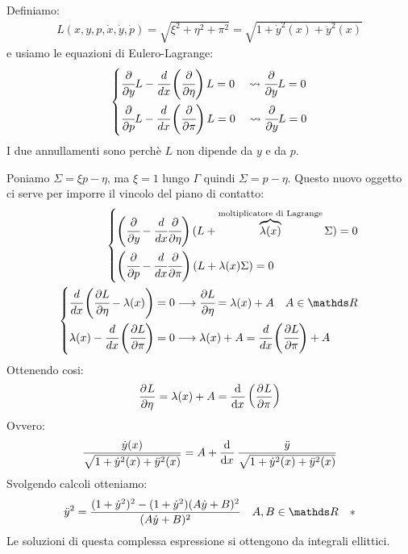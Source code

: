 Definiamo:
\begin{align*}
    L(x,y,p,\dot{x},\dot{y},\dot{p})=\sqrt{\xi^2+\eta^2+\pi^2}=\sqrt{1+\dot{y}^2(x)+\ddot{y}^2(x)}
\end{align*}
e usiamo le equazioni di Eulero-Lagrange:
\begin{align*}
    \begin{cases*}
        \cfrac{\partial}{\partial y}L-\cfrac{d}{dx}\left(\cfrac{\partial}{\partial \eta}\right)L=0 \quad \leadsto \cfrac{\partial}{\partial y}L=0\\
        \cfrac{\partial}{\partial p}L-\cfrac{d}{dx}\left(\cfrac{\partial}{\partial \pi}\right)L=0 \quad \leadsto \cfrac{\partial}{\partial y}L=0
    \end{cases*}
\end{align*}
I due annullamenti sono perchè $L$ non dipende da $y$ e da $p$.

Poniamo $\Sigma=\xi p-\eta$, ma $\xi=1$ lungo $\Gamma$ quindi $\Sigma=p-\eta$.
Questo nuovo oggetto ci serve per imporre il vincolo del piano di contatto:
\begin{align*}
    \begin{cases*}
        \left(\cfrac{\partial}{\partial y}-\cfrac{d}{dx}\cfrac{\partial}{\partial \eta}\right)(L+\overbrace{\lambda(x)}^{\text{moltiplicatore di Lagrange}}\Sigma)=0 \\
        \left(\cfrac{\partial}{\partial p}-\cfrac{d}{dx}\cfrac{\partial}{\partial \pi}\right)(L+\lambda(x)\Sigma)=0 
    \end{cases*}\\
    \begin{cases*}
        \cfrac{d}{dx}\left(\cfrac{\partial L}{\partial \eta}-\lambda(x)\right)=0\longrightarrow \cfrac{\partial L}{\partial \eta}=\lambda(x)+A \quad A\in \R\\
        \lambda(x)-\cfrac{d}{dx}\left(\cfrac{\partial L}{\partial \pi}\right)=0\longrightarrow\lambda(x)+A=\cfrac{d}{dx}\left(\cfrac{\partial L}{\partial \pi}\right)+A
    \end{cases*}
\end{align*}
Ottenendo cosi:
\begin{align*}
    \dpd{L}{\eta}=\lambda(x)+A=\dod{}{x}\left(\dpd{L}{\pi}\right)
\end{align*}
Ovvero:
\begin{align*}
    \frac{\dot{y}(x)}{\sqrt{1+\dot{y}^2(x)+\ddot{y}^2(x)}}=A+\dod{}{x}\frac{\ddot{y}}{\sqrt{1+\dot{y}^2(x)+\ddot{y}^2(x)}}
\end{align*}
Svolgendo calcoli otteniamo:
\begin{align*}
    \ddot{y}^2=\frac{(1+\dot{y}^2)^2-(1+\dot{y}^2)(A\dot{y}+B)^2}{(A\dot{y}+B)^2} \quad A,B\in \R \quad *
\end{align*}
Le soluzioni di questa complessa espressione si ottengono da integrali ellittici.

